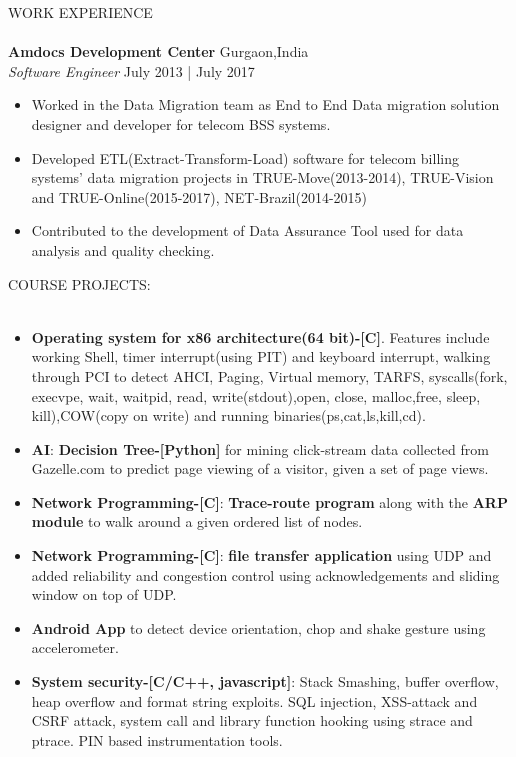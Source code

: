 \documentclass[a4paper]{article}
\newcommand{\lineunder} {
    \vspace*{-8pt} \\
    \hspace*{-18pt} \hrulefill \\
}
\newcommand{\header} [1] {
    {\hspace*{-18pt}\vspace*{6pt} \textsc{#1}}
    \vspace*{-6pt} \lineunder
}
\begin{document}
\header{WORK EXPERIENCE}

\textbf{Amdocs Development Center} \hfill Gurgaon,India\\
\textit{Software Engineer} \hfill July 2013 | July 2017\\
\begin{itemize}
\itemsep0em 
  \item Worked in the Data Migration team as End to End Data migration solution
    designer and developer for telecom BSS systems.
  \item Developed ETL(Extract-Transform-Load) software for telecom billing
    systems' data migration projects in TRUE-Move(2013-2014), TRUE-Vision and
    TRUE-Online(2015-2017), NET-Brazil(2014-2015)
  \item Contributed to the development of Data Assurance Tool used for data
    analysis and quality checking.
\end{itemize}
\newpage
\header{COURSE PROJECTS:}
\begin{itemize}
\itemsep0em 
    \item \textbf{Operating system for x86 architecture(64 bit)-[C]}. Features
      include working Shell, timer interrupt(using PIT) and keyboard interrupt,
      walking through PCI to detect AHCI, Paging, Virtual memory, TARFS,
      syscalls(fork, execvpe, wait, waitpid, read, write(stdout),open, close,
      malloc,free, sleep, kill),COW(copy on write) and running
      binaries(ps,cat,ls,kill,cd).\\
    \item \textbf{AI}: \textbf{Decision Tree-[Python]} for mining click-stream
      data collected from Gazelle.com to predict page viewing of a visitor,
      given a set of page views.\\
    \item \textbf{Network Programming-[C]}: \textbf{Trace-route program} along
      with the \textbf{ARP module} to walk around a given ordered list of
      nodes.\\
    \item \textbf{Network Programming-[C]}: \textbf{file transfer application}
      using UDP and added reliability and congestion control using
      acknowledgements and sliding window on top of UDP.\\
    \item \textbf{Android App} to detect device orientation, chop and shake
      gesture using accelerometer.\\
    \item \textbf{System security-[C/C++, javascript]}: Stack Smashing, buffer
      overflow, heap overflow and format string exploits. SQL injection,
      XSS-attack and CSRF attack, system call and library function hooking using
      strace and ptrace. PIN based instrumentation tools.
\end{itemize}
\end{document}
